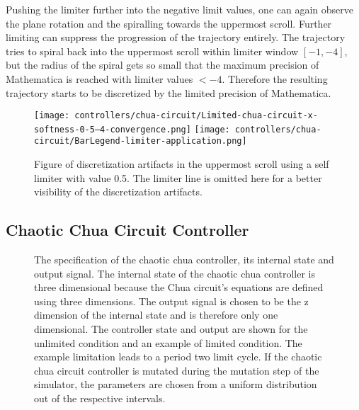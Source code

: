 \documentclass[main]{subfiles}
\begin{document}
Pushing the limiter further into the negative limit values, one can again observe the plane rotation and the spiralling towards the uppermost scroll. %
%
Further limiting can suppress the progression of the trajectory entirely. %
%
The trajectory tries to spiral back into the uppermost scroll within limiter window \([-1,-4]\), but the radius of the spiral gets so small that the maximum precision of Mathematica is reached with limiter values \(<-4\).
%
Therefore the resulting trajectory starts to be discretized by the limited precision of Mathematica.

\begin{figure}[H]
\centering
\texttt{[image: controllers/chua-circuit/Limited-chua-circuit-x-softness-0-5--4-convergence.png]}
\texttt{[image: controllers/chua-circuit/BarLegend-limiter-application.png]}
\caption[Figure showing discretization artifacts]{Figure of discretization artifacts in the uppermost scroll using a self limiter with value 0.5. The limiter line is omitted here for a better visibility of the discretization artifacts.}
\label{figure:x-0.5-discretization}
\end{figure}

\subsection{Chaotic Chua Circuit Controller}

\begin{figure}[H]
\centering


\caption[The chaotic chua controller]{The specification of the chaotic chua controller, its internal state and output signal. The internal state of the chaotic chua controller is three dimensional because the Chua circuit's equations are defined using three dimensions. The output signal is chosen to be the z dimension of the internal state and is therefore only one dimensional. The controller state and output are shown for the unlimited condition and an example of limited condition. The example limitation leads to a period two limit cycle. If the chaotic chua circuit controller is mutated during the mutation step of the simulator, the parameters are chosen from a uniform distribution out of the respective intervals.}
\label{figure:chua-controller}
\end{figure}
\end{document}
